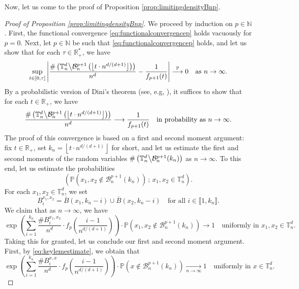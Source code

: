 \documentclass[a4paper,11pt]{article}
\begin{document}
Now, let us come to the proof of Proposition \ref{prop:limitingdensityBnp}.

\begin{proof}[Proof of Proposition \ref{prop:limitingdensityBnp}]
We proceed by induction on $p\in\mathbb{N}$.
First, the functional convergence \eqref{eq:functionalconvergencep} holds vacuously for $p=0$.
Next, let $p\in\mathbb{N}$ be such that \eqref{eq:functionalconvergencep} holds, and let us show that for each $\tau\in\mathbb{R}_+^*$, we have
\[\sup_{t\in[0,\tau]}\left|\frac{\#\left(\mathbb{T}_n^d\middle\backslash\mathcal{B}_n^{p+1}\left(\left\lfloor t\cdot n^{d/(d+1)}\right\rfloor\right)\right)}{n^d}-\frac{1}{f_{p+1}(t)}\right|\overset{\mathbb{P}}{\longrightarrow}0\quad\text{as $n\to\infty$.}\]
By a probabilistic version of Dini's theorem (see, e.g, \cite[Lemma 11.6]{chef}), it suffices to show that for each $t\in\mathbb{R}_+$, we have
\begin{equation}\label{eq:convoitedconv}
\frac{\#\left(\mathbb{T}_n^d\middle\backslash\mathcal{B}_n^{p+1}\left(\left\lfloor t\cdot n^{d/(d+1)}\right\rfloor\right)\right)}{n^d}\longrightarrow\frac{1}{f_{p+1}(t)}\quad\text{in probability as $n\to\infty$.}
\end{equation}
The proof of this convergence is based on a first and second moment argument: fix $t\in\mathbb{R}_+$, set $k_n=\left\lfloor t\cdot n^{d/(d+1)}\right\rfloor$ for short, and let us estimate the first and second moments of the random variables $\#\left(\mathbb{T}_n^d\middle\backslash\mathcal{B}_n^{p+1}(k_n)\right)$ as $n\to\infty$.
To this end, let us estimate the probabilities
\[\left(\mathbb{P}\left(x_1,x_2\notin\mathcal{B}_n^{p+1}(k_n)\right)\,;\,x_1,x_2\in\mathbb{T}_n^d\right).\]
For each $x_1,x_2\in\mathbb{T}_n^d$, we set
\[B_i^{x_1,x_2}=\overline{B}(x_1,k_n-i)\cup\overline{B}(x_2,k_n-i)\quad\text{for all $i\in\llbracket1,k_n\rrbracket$.}\]
We claim that as $n\to\infty$, we have
\begin{equation}\label{eq:keylemestimate}
\exp\left(\sum_{i=1}^{k_n}\frac{\#B_i^{x_1,x_2}}{n^d}\cdot f_p\left(\frac{i-1}{n^{d/(d+1)}}\right)\right)\cdot\mathbb{P}\left(x_1,x_2\notin\mathcal{B}_n^{p+1}(k_n)\right)\longrightarrow1\quad\text{uniformly in $x_1,x_2\in\mathbb{T}_n^d$.}
\end{equation}
Taking this for granted, let us conclude our first and second moment argument.
First, by \eqref{eq:keylemestimate}, we obtain that
\[\exp\left(\sum_{i=1}^{k_n}\frac{\#B_i^{x,x}}{n^d}\cdot f_p\left(\frac{i-1}{n^{d/(d+1)}}\right)\right)\cdot\mathbb{P}\left(x\notin\mathcal{B}_n^{p+1}(k_n)\right)\underset{n\to\infty}{\longrightarrow}1\quad\text{uniformly in $x\in\mathbb{T}_n^d$.}\]

\end{proof}
\end{document}
